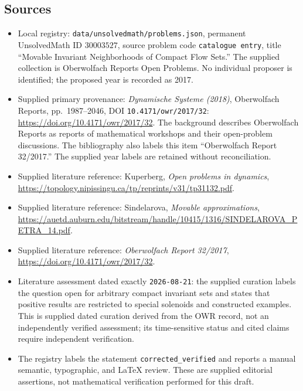 \documentclass[11pt]{article}
\begin{document}
\subsection{Sources}
\begin{itemize}
\item Local registry: \texttt{data/unsolvedmath/problems.json}, permanent UnsolvedMath ID \(30003527\), source problem code \texttt{catalogue entry}, title ``Movable Invariant Neighborhoods of Compact Flow Sets.'' The supplied collection is Oberwolfach Reports Open Problems. No individual proposer is identified; the proposed year is recorded as 2017.
\item Supplied primary provenance: \emph{Dynamische Systeme (2018)}, Oberwolfach Reports, pp.~1987--2046, DOI \texttt{10.4171/owr/2017/32}: \url{https://doi.org/10.4171/owr/2017/32}. The background describes Oberwolfach Reports as reports of mathematical workshops and their open-problem discussions. The bibliography also labels this item ``Oberwolfach Report 32/2017.'' The supplied year labels are retained without reconciliation.
\item Supplied literature reference: Kuperberg, \emph{Open problems in dynamics}, \url{https://topology.nipissingu.ca/tp/reprints/v31/tp31132.pdf}.
\item Supplied literature reference: Sindelarova, \emph{Movable approximations}, \url{https://auetd.auburn.edu/bitstream/handle/10415/1316/SINDELAROVA_PETRA_14.pdf}.
\item Supplied literature reference: \emph{Oberwolfach Report 32/2017}, \url{https://doi.org/10.4171/owr/2017/32}.
\item Literature assessment dated exactly \texttt{2026-08-21}: the supplied curation labels the question open for arbitrary compact invariant sets and states that positive results are restricted to special solenoids and constructed examples. This is supplied dated curation derived from the OWR record, not an independently verified assessment; its time-sensitive status and cited claims require independent verification.
\item The registry labels the statement \texttt{corrected\_verified} and reports a manual semantic, typographic, and LaTeX review. These are supplied editorial assertions, not mathematical verification performed for this draft.
\end{itemize}
\end{document}
